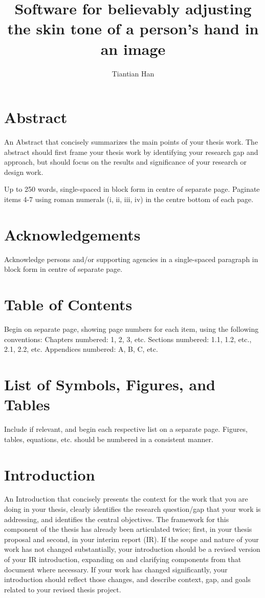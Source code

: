 \documentclass[12pt, a4paper]{article}
\title{Software for believably adjusting the skin tone of a person's hand in an image}
\author{Tiantian Han}
\begin{document}


\section{Abstract}
An Abstract that concisely summarizes the main points of your thesis work. The abstract should first frame your thesis work by identifying your research gap and approach, but should focus on the results and significance of your research or design work.

Up to 250 words, single-spaced in block form in centre of separate page. Paginate items 4-7 using roman numerals (i, ii, iii, iv) in the centre bottom of each page.
\pagebreak

\section{Acknowledgements}
Acknowledge persons and/or supporting agencies in a single-spaced paragraph in block form in centre of separate page.
\pagebreak

\section{Table of Contents}
Begin on separate page, showing page numbers for each item, using the following conventions:
Chapters numbered: 1, 2, 3, etc.
Sections numbered: 1.1, 1.2, etc., 2.1, 2.2, etc. Appendices numbered: A, B, C, etc.
\pagebreak

\section{List of Symbols, Figures, and Tables}
Include if relevant, and begin each respective list on a separate page. Figures, tables, equations, etc. should be numbered in a consistent manner.
\pagebreak

\section{Introduction}
An Introduction that concisely presents the context for the work that you are doing in your thesis, clearly identifies the research question/gap that your work is addressing, and identifies the central objectives. The framework for this component of the thesis has already been articulated twice; first, in your thesis proposal and second, in your interim report (IR). If the scope and nature of your work has not changed substantially, your introduction should be a revised version of your IR introduction, expanding on and clarifying components from that document where necessary. If your work has changed significantly, your introduction should reflect those changes, and describe context, gap, and goals related to your revised thesis project.
\pagebreak
\end{document}
